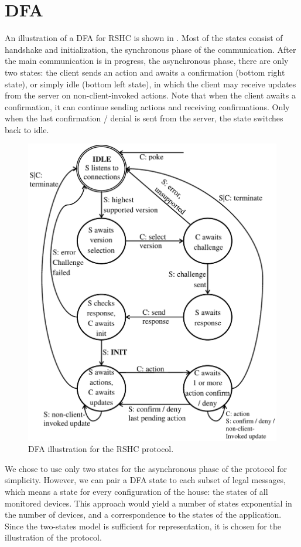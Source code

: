 \section{DFA}
\label{sec:dfa}

An illustration of a DFA for RSHC is shown in . Most of the states consist of handshake and initialization, the synchronous phase of the communication. After the main communication is in progress, the asynchronous phase, there are only two states: the client sends an action and awaits a confirmation (bottom right state), or simply idle (bottom left state), in which the client may receive updates from the server on non-client-invoked actions. Note that when the client awaits a confirmation, it can continue sending actions and receiving confirmations. Only when the last confirmation / denial is sent from the server, the state switches back to idle.

\begin{figure}[h]
  \centering
  \label{fig:dfa:dfa}
  \includegraphics[width=5in]{figures/dfa.pdf}
  \caption{DFA illustration for the RSHC protocol.}
\end{figure}

We chose to use only two states for the asynchronous phase of the protocol for simplicity. However, we can pair a DFA state to each subset of legal messages, which means a state for every configuration of the house: the states of all monitored devices. This approach would yield a number of states exponential in the number of devices, and a correspondence to the states of the application. Since the two-states model is sufficient for representation, it is chosen for the illustration of the protocol.

